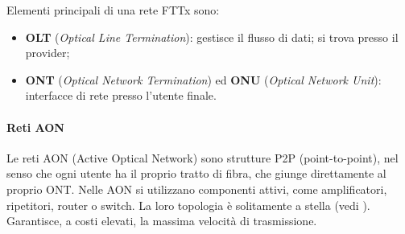 \documentclass[a4paper,11pt]{article}
\def\vedi#1{\nameref{#1}}
\begin{document}
Elementi principali di una rete FTTx sono:
\begin{itemize}
\item \textbf{OLT} (\textit{Optical Line Termination}): gestisce il flusso di dati; si trova presso il provider;
\item \textbf{ONT} (\textit{Optical Network Termination}) ed \textbf{ONU} (\textit{Optical Network Unit}): interfacce di rete presso l'utente finale.
\end{itemize}
\paragraph{Reti AON} Le reti AON (Active Optical Network) sono strutture P2P (point-to-point), nel senso che ogni utente ha il proprio tratto di fibra, che giunge direttamente al proprio ONT. Nelle AON si utilizzano componenti attivi, come amplificatori, ripetitori, router o switch. La loro topologia è solitamente a stella (vedi \vedi{Rete a stella}). Garantisce, a costi elevati, la massima velocità di trasmissione.
\end{document}
